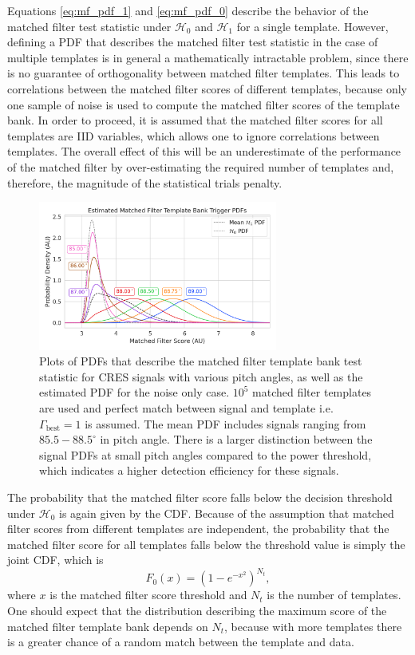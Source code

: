 Equations \ref{eq:mf_pdf_1} and \ref{eq:mf_pdf_0} describe the behavior of the matched filter test statistic under $\mathcal{H}_0$ and $\mathcal{H}_1$ for a single template. However, defining a PDF that describes the matched filter test statistic in the case of multiple templates is in general a mathematically intractable problem, since there is no guarantee of orthogonality between matched filter templates. This leads to correlations between the matched filter scores of different templates, because only one sample of noise is used to compute the matched filter scores of the template bank. In order to proceed, it is assumed that the matched filter scores for all templates are IID variables, which allows one to ignore correlations between templates. The overall effect of this will be an underestimate of the performance of the matched filter by over-estimating the required number of templates and, therefore, the magnitude of the statistical trials penalty.

\begin{figure}[htbp]
    \centering
    \includegraphics[width=0.7\textwidth]{figs/Chapter-4/230329_mf_pdf_by_pitch.png}
    \caption{Plots of PDFs that describe the matched filter template bank test statistic for CRES signals with various pitch angles, as well as the estimated PDF for the noise only case. $10^5$ matched filter templates are used and perfect match between signal and template i.e. $\Gamma_\mathrm{best}=1$ is assumed. The mean PDF includes signals ranging from $85.5-88.5^\circ$ in pitch angle. There is a larger distinction between the signal PDFs at small pitch angles compared to the power threshold, which indicates a higher detection efficiency for these signals.}
    \label{fig:mf_pdf}
\end{figure}

The probability that the matched filter score falls below the decision threshold under $\mathcal{H}_0$ is again given by the CDF. Because of the assumption that matched filter scores from different templates are independent, the probability that the matched filter score for all templates falls below the threshold value is simply the joint CDF, which is
\begin{equation}
    F_{0}(x) = \left(1-e^{-x^2}\right)^{N_t},
    \label{eq:mf_joint_cdf_0}
\end{equation}
where $x$ is the matched filter score threshold and $N_t$ is the number of templates. One should expect that the distribution describing the maximum score of the matched filter template bank depends on $N_t$, because with more templates there is a greater chance of a random match between the template and data.

